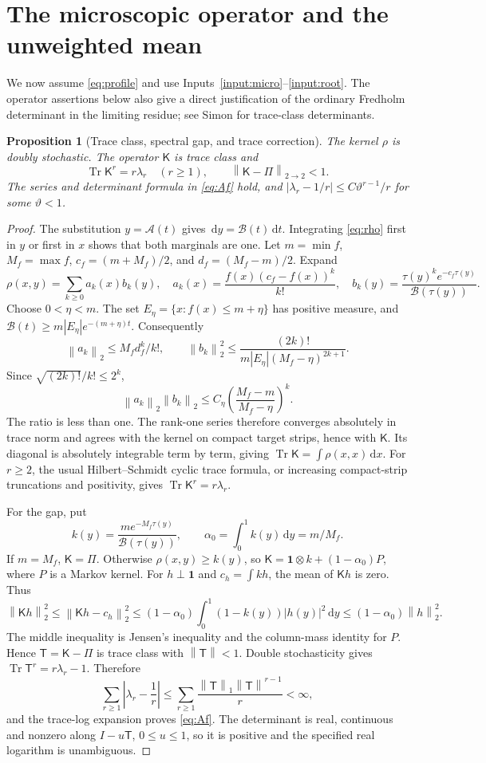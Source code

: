 \documentclass[11pt]{article}
\numberwithin{equation}{section}
\newtheorem{proposition}[theorem]{Proposition}
\theoremstyle{definition}
\theoremstyle{remark}
\newcommand{\one}{\mathbf 1}
\newcommand{\dd}{\,\mathrm d}
\newcommand{\Tr}{\operatorname{Tr}}
\newcommand{\cA}{\mathcal A}
\newcommand{\cB}{\mathcal B}
\newcommand{\Kop}{\mathsf K}
\newcommand{\Top}{\mathsf T}
\newcommand{\norm}[1]{\left\|#1\right\|}
\begin{document}
\section{The microscopic operator and the unweighted mean}\label{sec:operator}

We now assume \eqref{eq:profile} and use Inputs~\ref{input:micro}--\ref{input:root}. The operator assertions below also give a direct justification of the ordinary Fredholm determinant in the limiting residue; see Simon \cite[Chapter 3]{Simon} for trace-class determinants.

\begin{proposition}[Trace class, spectral gap, and trace correction]\label{prop:operator}
The kernel $\rho$ is doubly stochastic. The operator $\Kop$ is trace class and
\[
 \Tr\Kop^r=r\lambda_r\quad(r\ge1),\qquad
 \norm{\Kop-\Pi}_{2\to2}<1.
\]
The series and determinant formula in \eqref{eq:Af} hold, and
$|\lambda_r-1/r|\le C\vartheta^{r-1}/r$ for some $\vartheta<1$.
\end{proposition}
\begin{proof}
The substitution $y=\cA(t)$ gives $\dd y=\cB(t)\dd t$. Integrating \eqref{eq:rho} first in $y$ or first in $x$ shows that both marginals are one.
Let $m=\min f$, $M_f=\max f$, $c_f=(m+M_f)/2$, and $d_f=(M_f-m)/2$. Expand
\[
 \rho(x,y)=\sum_{k\ge0}a_k(x)b_k(y),\quad
 a_k(x)=\frac{f(x)(c_f-f(x))^k}{k!},\quad
 b_k(y)=\frac{\tau(y)^k e^{-c_f\tau(y)}}{\cB(\tau(y))}.
\]
Choose $0<\eta<m$. The set $E_\eta=\{x:f(x)\le m+\eta\}$ has positive measure, and
$\cB(t)\ge m|E_\eta|e^{-(m+\eta)t}$. Consequently
\[
 \norm{a_k}_2\le M_f d_f^k/k!,\qquad
 \norm{b_k}_2^2\le
 \frac{(2k)!}{m|E_\eta|(M_f-\eta)^{2k+1}}.
\]
Since $\sqrt{(2k)!}/k!\le2^k$,
\[
 \norm{a_k}_2\norm{b_k}_2
 \le C_\eta\left(\frac{M_f-m}{M_f-\eta}\right)^k.
\]
The ratio is less than one. The rank-one series therefore converges absolutely in trace norm and agrees with the kernel on compact target strips, hence with $\Kop$. Its diagonal is absolutely integrable term by term, giving $\Tr\Kop=\int\rho(x,x)\dd x$. For $r\ge2$, the usual Hilbert--Schmidt cyclic trace formula, or increasing compact-strip truncations and positivity, gives $\Tr\Kop^r=r\lambda_r$.

For the gap, put
\[
 k(y)=\frac{m e^{-M_f\tau(y)}}{\cB(\tau(y))},\qquad
 \alpha_0=\int_0^1k(y)\dd y=m/M_f.
\]
If $m=M_f$, $\Kop=\Pi$. Otherwise $\rho(x,y)\ge k(y)$, so
$\Kop=\one\otimes k+(1-\alpha_0)P$, where $P$ is a Markov kernel. For $h\perp\one$ and $c_h=\int kh$, the mean of $\Kop h$ is zero. Thus
\[
 \norm{\Kop h}_2^2\le\norm{\Kop h-c_h}_2^2
 \le(1-\alpha_0)\int_0^1(1-k(y))|h(y)|^2\dd y
 \le(1-\alpha_0)\norm h_2^2.
\]
The middle inequality is Jensen's inequality and the column-mass identity for $P$. Hence $\Top=\Kop-\Pi$ is trace class with $\norm\Top<1$. Double stochasticity gives $\Tr\Top^r=r\lambda_r-1$. Therefore
\[
 \sum_{r\ge1}\left|\lambda_r-\frac1r\right|
 \le\sum_{r\ge1}\frac{\norm\Top_1\norm\Top^{r-1}}r<\infty,
\]
and the trace-log expansion proves \eqref{eq:Af}. The determinant is real, continuous and nonzero along $I-u\Top$, $0\le u\le1$, so it is positive and the specified real logarithm is unambiguous.
\end{proof}
\end{document}
